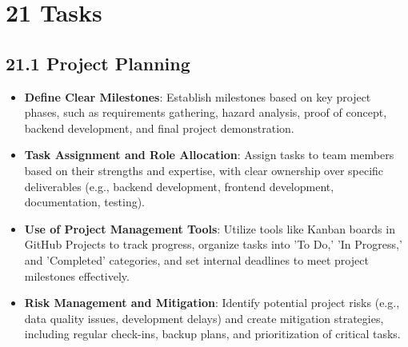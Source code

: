 \documentclass[12pt]{article}
\begin{document}
\section*{21 Tasks}

\subsection*{21.1 Project Planning}
\begin{itemize} 
    \item \textbf{Define Clear Milestones}: Establish milestones based on key project phases, such as requirements gathering, hazard analysis, proof of concept, backend development, and final project demonstration.
    \item \textbf{Task Assignment and Role Allocation}: Assign tasks to team members based on their strengths and expertise, with clear ownership over specific deliverables (e.g., backend development, frontend development, documentation, testing).
    \item \textbf{Use of Project Management Tools}: Utilize tools like Kanban boards in GitHub Projects to track progress, organize tasks into 'To Do,' 'In Progress,' and 'Completed' categories, and set internal deadlines to meet project milestones effectively.
    \item \textbf{Risk Management and Mitigation}: Identify potential project risks (e.g., data quality issues, development delays) and create mitigation strategies, including regular check-ins, backup plans, and prioritization of critical tasks.
\end{itemize}
\end{document}
